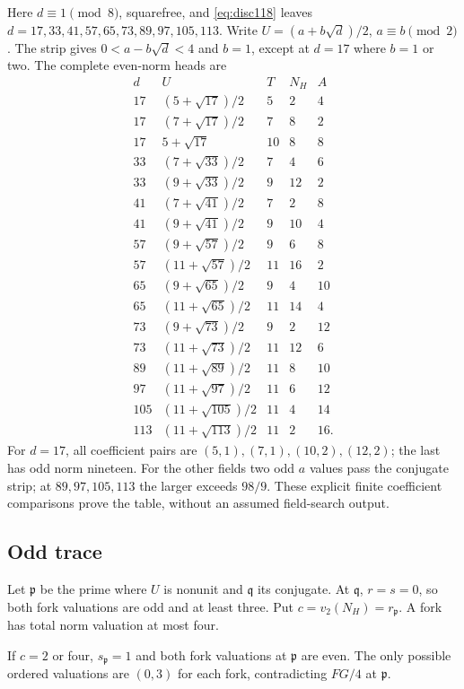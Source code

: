 \documentclass[11pt]{article}
\begin{document}
Here $d\equiv1\pmod8$, squarefree, and \eqref{eq:disc118}
leaves $d=17,33,41,57,65,73,89,97,105,113$.
Write $U=(a+b\sqrt d)/2$, $a\equiv b\pmod2$.
The strip gives $0<a-b\sqrt d<4$ and $b=1$,
except at $d=17$ where $b=1$ or two.
The complete even-norm heads are
\[
\begin{array}{r|l|r|r|r}
d&U&T&N_H&A\\\hline
17&(5+\sqrt{17})/2&5&2&4\\
17&(7+\sqrt{17})/2&7&8&2\\
17&5+\sqrt{17}&10&8&8\\
33&(7+\sqrt{33})/2&7&4&6\\
33&(9+\sqrt{33})/2&9&12&2\\
41&(7+\sqrt{41})/2&7&2&8\\
41&(9+\sqrt{41})/2&9&10&4\\
57&(9+\sqrt{57})/2&9&6&8\\
57&(11+\sqrt{57})/2&11&16&2\\
65&(9+\sqrt{65})/2&9&4&10\\
65&(11+\sqrt{65})/2&11&14&4\\
73&(9+\sqrt{73})/2&9&2&12\\
73&(11+\sqrt{73})/2&11&12&6\\
89&(11+\sqrt{89})/2&11&8&10\\
97&(11+\sqrt{97})/2&11&6&12\\
105&(11+\sqrt{105})/2&11&4&14\\
113&(11+\sqrt{113})/2&11&2&16.
\end{array}
\]
For $d=17$, all coefficient pairs are
$(5,1),(7,1),(10,2),(12,2)$; the last has odd norm nineteen.
For the other fields two odd $a$ values pass the conjugate strip;
at $89,97,105,113$ the larger exceeds $98/9$.
These explicit finite coefficient comparisons prove the table,
without an assumed field-search output.

\subsection{Odd trace}
Let $\mathfrak p$ be the prime where $U$ is nonunit and
$\mathfrak q$ its conjugate. At $\mathfrak q$, $r=s=0$,
so both fork valuations are odd and at least three.
Put $c=v_2(N_H)=r_{\mathfrak p}$.
A fork has total norm valuation at most four.

If $c=2$ or four, $s_{\mathfrak p}=1$ and both fork valuations
at $\mathfrak p$ are even. The only possible ordered valuations
are $(0,3)$ for each fork, contradicting $FG/4$ at
$\mathfrak p$.
\end{document}
